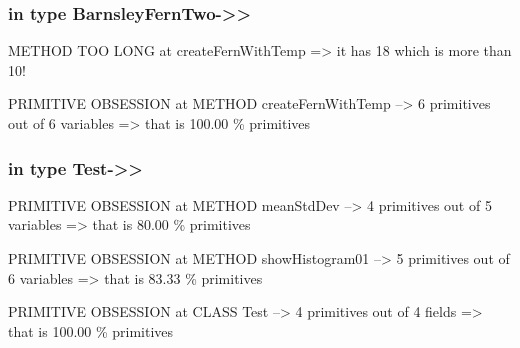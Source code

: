 \documentclass[a4paper]{article}
\begin{document}
\begin{flushleft}
	\subsubsection{in type
		BarnsleyFernTwo-\textgreater{}\textgreater{}}\label{in-type-barnsleyferntwo-}

	METHOD TOO LONG at createFernWithTemp =\textgreater{} it has 18 which is
	more than 10!

	PRIMITIVE OBSESSION at METHOD createFernWithTemp --\textgreater{} 6
	primitives out of 6 variables =\textgreater{} that is 100.00 \%
	primitives

	\subsubsection{in type Test-\textgreater{}\textgreater{}}\label{in-type-test-}

	PRIMITIVE OBSESSION at METHOD meanStdDev --\textgreater{} 4 primitives
	out of 5 variables =\textgreater{} that is 80.00 \% primitives

	PRIMITIVE OBSESSION at METHOD showHistogram01 --\textgreater{} 5
	primitives out of 6 variables =\textgreater{} that is 83.33 \%
	primitives

	PRIMITIVE OBSESSION at CLASS Test --\textgreater{} 4 primitives out of 4
	fields =\textgreater{} that is 100.00 \% primitives

\end{flushleft}
\end{document}
